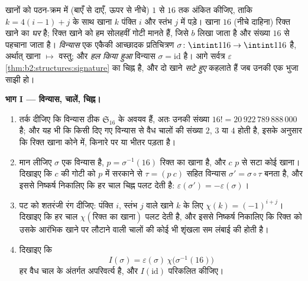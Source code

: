 \begin{problem}
\label{pb:b2:structures:1}
खानों को पठन-क्रम में (बाएँ से दाएँ, ऊपर से नीचे) $1$ से $16$ तक अंकित
कीजिए, ताकि $k
= 4(i - 1) + j$ के साथ खाना $k$ पंक्ति $i$ और स्तंभ $j$ में पड़े।
खाना $16$ (नीचे दाहिना) रिक्त खाने का \emph{घर} है; रिक्त खाने को हम
सोलहवीं गोटी मानते हैं, जिसे $b$ लिखा जाता है और संख्या $16$ से पहचाना
जाता है। \emph{विन्यास} एक एकैकी आच्छादक प्रतिचित्रण $\sigma \colon \intint1{16}
\to \intint1{16}$ है, अर्थात्
खाना $\mapsto$ वस्तु; और \emph{हल किया हुआ} विन्यास $\sigma = \mathrm{id}$ है। आगे सर्वत्र
$\varepsilon$ \cref{thm:b2:structures:signature} का चिह्न है, और दो खाने \emph{सटे हुए} कहलाते हैं जब उनकी
एक भुजा साझी हो।

\medskip
\noindent\textbf{भाग I --- विन्यास, चालें, चिह्न।}
\begin{enumerate}
  \item तर्क दीजिए कि विन्यास ठीक $\mathfrak{S}_{16}$ के अवयव हैं, अतः उनकी संख्या
        $16! =
        20\,922\,789\,888\,000$ है; और यह भी कि किसी दिए गए विन्यास से वैध चालों की
        संख्या $2$, $3$ या $4$ होती है, इसके अनुसार कि रिक्त खाना
        कोने में, किनारे पर या भीतर पड़ता है।
  \item मान लीजिए $\sigma$ एक विन्यास है, $p = \sigma^{-1}(16)$ रिक्त का खाना है, और $c$
        $p$ से सटा कोई खाना। दिखाइए कि $c$ की गोटी को $p$ में
        सरकाने से $\tau =
        (p\ c)$ सहित विन्यास $\sigma' = \sigma \circ \tau$ बनता है, और इससे निष्कर्ष
        निकालिए कि हर चाल चिह्न पलट देती है: $\varepsilon(\sigma') = -\varepsilon(\sigma)$।
  \item पट को शतरंजी रंग दीजिए: पंक्ति $i$, स्तंभ $j$ वाले खाने
        $k$ के लिए $\chi(k) = (-1)^{i+j}$। दिखाइए कि हर चाल $\chi(\text{रिक्त का
        खाना})$ पलट देती है, और इससे निष्कर्ष निकालिए कि रिक्त को
        उसके आरंभिक खाने पर लौटाने वाली चालों की कोई भी शृंखला सम
        लंबाई की होती है।
  \item दिखाइए कि
        \[
        I(\sigma) = \varepsilon(\sigma)\,
        \chi\bigl(\sigma^{-1}(16)\bigr)
        \]
        हर वैध चाल के अंतर्गत अपरिवर्त्य है, और $I(\mathrm{id})$ परिकलित कीजिए।
\end{enumerate}


\end{problem}
